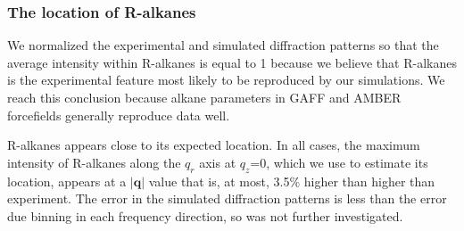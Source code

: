 \documentclass[journal=jpcbfk,manuscript=article]{achemso}
\begin{document}
%
  
  \subsubsection{The location of R-alkanes}\label{section:ralkanes}

  We normalized the experimental and simulated diffraction patterns so that the
  average intensity within R-alkanes is equal to 1 because we believe that
  R-alkanes is the experimental feature most likely to be reproduced by our
  simulations.  We reach this conclusion because alkane parameters in GAFF and
  AMBER forcefields generally reproduce data well.~\cite{wang_development_2004,caleman_force_2012} 

  R-alkanes appears close to its expected location. In all cases, the maximum
  intensity of R-alkanes along the $q_r$ axis at $q_z$=0, which we use to
  estimate its location, appears at a $|\mathbf{q}|$ value that is, at most,
  3.5\% higher than higher than experiment. The error in the simulated 
  diffraction patterns is less than the error due binning in each frequency
  direction, so was not further investigated. 
\end{document}
